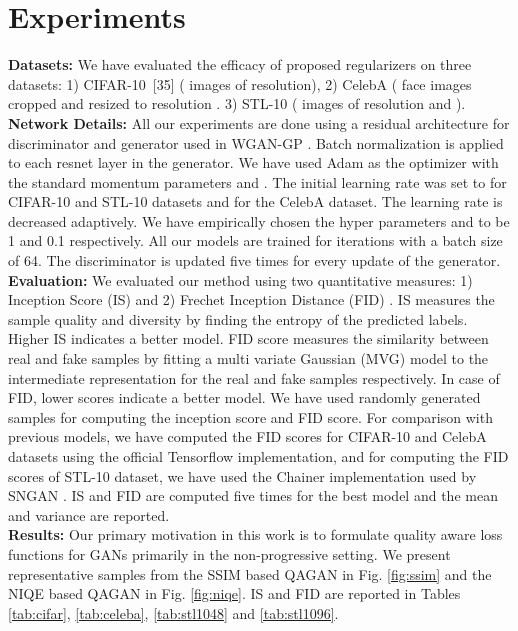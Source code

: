 \documentclass{article}
\begin{document}
\section{Experiments}
\textbf{Datasets:} We have evaluated the efficacy of proposed regularizers on three datasets:
1) CIFAR-10\ [35] ( images of  resolution), 2) CelebA \cite{liu2015deep}( face images cropped and resized to resolution . 3) STL-10  \cite{coates2011analysis}
 ( images of resolution  and ).
\\
\textbf{Network Details:}
All our experiments are done using a residual architecture for discriminator and generator used in WGAN-GP \cite{gulrajani2017improved}. Batch normalization is applied to each resnet layer in the generator. We have used Adam as the optimizer with the standard momentum parameters  and . The initial learning rate was set to  for CIFAR-10 and STL-10 datasets and  for the CelebA dataset. The learning rate is decreased adaptively. We have empirically chosen the hyper parameters  and  to be 1 and 0.1 respectively. All our models are trained for  iterations with a batch size of 64. The discriminator is updated five times for every update of the generator.
\\
\textbf{Evaluation:} We evaluated our method using two quantitative measures: 1) Inception Score (IS) \cite{salimans2016improved} and 2) Frechet Inception Distance (FID) \cite{heusel2017gans}. IS measures the sample quality and diversity by finding the entropy of the predicted labels. Higher IS indicates a better model. FID score  measures the similarity between real and fake samples by fitting a multi variate Gaussian (MVG) model to the intermediate representation for the real and fake samples respectively. In case of FID, lower scores indicate a better model. We have used  randomly generated samples for computing the inception score and FID score. For comparison with previous models, we have computed the FID scores for CIFAR-10 and CelebA datasets using the official Tensorflow implementation, and for computing the FID scores of STL-10 dataset, we have used the Chainer implementation used by SNGAN \cite{miyato2018spectral}. IS and FID are computed five times for the best model and the mean and variance are reported.
\\
\textbf{Results:} 
Our primary motivation in this work is to formulate quality aware loss functions for GANs primarily in the non-progressive setting. We present representative samples from the SSIM based QAGAN in Fig. \ref{fig:ssim} and the NIQE based QAGAN in Fig. \ref{fig:niqe}. IS and FID are reported in Tables \ref{tab:cifar},  \ref{tab:celeba}, \ref{tab:stl1048} and \ref{tab:stl1096}.
\end{document}

